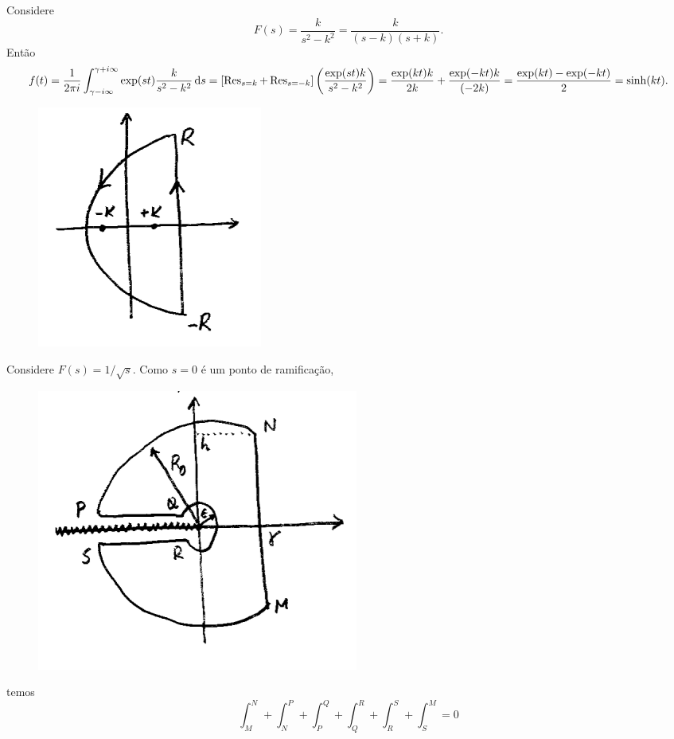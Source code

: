 \begin{exem}
  Considere
  \begin{dmath*}
    F(s) = \frac{k}{s^2 - k^2}
    = \frac{k}{(s - k) (s + k)}.
  \end{dmath*}
  Então
  \begin{dmath*}
    f(t) = \frac{1}{2 \pi i} \int_{\gamma - i \infty}^{\gamma + i \infty} \exp(s
    t) \frac{k}{s^2 - k^2} \vi{s}
    = \left[ \Res_{s = k} + \Res_{s = -k} \right] \left( \frac{\exp(s t) k}{s^2
    - k^2} \right)
    = \frac{\exp(k t) k}{2 k} + \frac{\exp(-k t) k}{(-2 k)}
    = \frac{\exp(k t) - \exp(-k t)}{2}
    = \sinh(k t).
  \end{dmath*}
  \begin{figure}[htb]
    \centering
    \includegraphics{figuras/14-1}
  \end{figure}
\end{exem}

\begin{exem}
  Considere $F(s) = 1 / \sqrt{s}$. Como $s = 0$ é um ponto de ramificação,
  \begin{figure}[htb]
    \centering
    \includegraphics{figuras/14-2}
  \end{figure}
  temos
  \begin{dmath*}
    \int_M^N + \int_N^P + \int_P^Q + \int_Q^R + \int_R^S + \int_S^M = 0
  \end{dmath*}
\end{exem}

